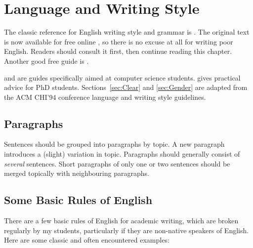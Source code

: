 %
%
% 
% 
% 


\chapter{Language and Writing Style}

\label{chap:Style}



The classic reference for English writing style and grammar is
\citet{StrunkWhite}. The original text is now available for free
online \citep{Strunk}, so there is no excuse at all for writing poor
English. Readers should consult it first, then continue reading this
chapter. Another good free guide is \citet{NASAGuide}.

\citet{Zobel-WritingCompSci} and \citet{BugsInWriting} are guides
specifically aimed at computer science students.
\citet{Phillips-HowGetPhD} gives practical advice for PhD
students. Sections~\ref{sec:Clear} and \ref{sec:Gender} are adapted
from the ACM CHI'94 conference language and writing style guidelines.




\section{Paragraphs}

Sentences should be grouped into paragraphs by topic. A new paragraph
introduces a (slight) variation in topic. Paragraphs should generally
consist of \emph{several} sentences. Short paragraphs of only one or
two sentences should be merged topically with neighbouring paragraphs.



\section{Some Basic Rules of English}

There are a few basic rules of English for academic writing, which are
broken regularly by my students, particularly if they are non-native
speakers of English. Here are some classic and often encountered
examples:

